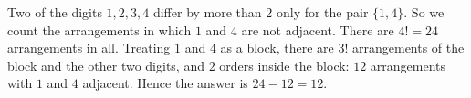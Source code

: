 Two of the digits $1,2,3,4$ differ by more than $2$ only for the pair $\{1,4\}$. So we count the arrangements in which $1$ and $4$ are not adjacent. There are $4!=24$ arrangements in all. Treating $1$ and $4$ as a block, there are $3!$ arrangements of the block and the other two digits, and $2$ orders inside the block: $12$ arrangements with $1$ and $4$ adjacent. Hence the answer is $24-12=\boxed{12}$.
